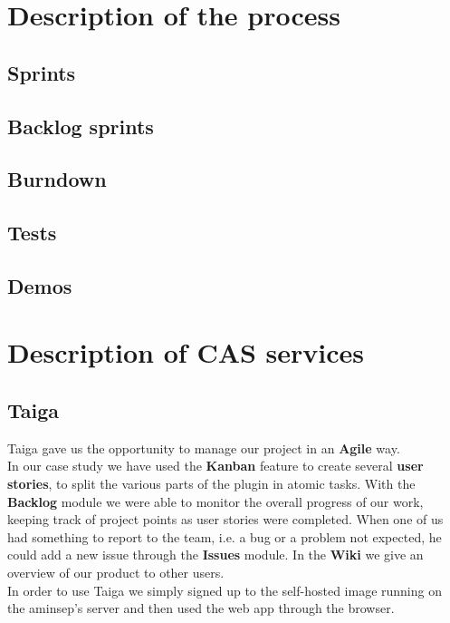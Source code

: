 \documentclass[a4paper,12pt]{report}
\begin{document}
\chapter{Description of the process}
\section{Sprints}

\section{Backlog sprints}

\section{Burndown}

\section{Tests}

\section{Demos}

\chapter{Description of CAS services}

\section[Taiga]{Taiga}
Taiga gave us the opportunity to manage our project in an \textbf{Agile} way. \\
In our case study we have used the \textbf{Kanban} feature to create several \textbf{user stories}, to split the various parts of the plugin in atomic tasks. With the \textbf{Backlog} module we were able to monitor the overall progress of our work, keeping track of project points as user stories were completed. When one of us had something to report to the team, i.e. a bug or a problem not expected, he could add a new issue through the \textbf{Issues} module.
In the \textbf{Wiki} we give an overview of our product to other users.\\
In order to use Taiga we simply signed up to the self-hosted image running on the aminsep's server and then used the web app through the browser.
\end{document}
